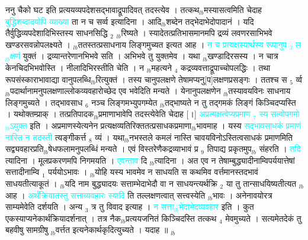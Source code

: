 \documentclass[article,12pt,a4paper]{memoir}%
\newcommand{\quotelemma}[1]{\textcolor{cyan}{#1}}
\newcounter{parCount}
\begin{document}
	  
	  \pstart \leavevmode%
	ननु चैको घट इति प्रत्ययव्यपदेशसद्भावाद्रूपादिवत् तदस्त्येव । तत्कथ{\tiny $_{lb}$}मस्यासत्वमिति चेदाह \quotelemma{बुद्धिशब्दादयोपि व्याख्या} ता न च सर्व्व इत्यादिना । आदि{\tiny $_{lb}$}शब्देन तद्भेदाभेदोपादानं । यदि तैर्वुद्धिव्यपदेशादिभिस्तस्य साधनसिद्धि {\tiny $_{2}$} {\tiny $_{lb}$}रिष्यते । स्यादेतत्प्रतिभासमानमपि द्रव्यं लवणरसाभिभवे खण्डरसवन्नोपलक्ष्यते । {\tiny $_{lb}$}ततस्तत्प्रसाधनाय लिङ्गमुच्यत इत्यत आह । \quotelemma{न च प्रत्यक्षस्यार्थस्य रूपानुप {\tiny $_{3}$} ल{\tiny $_{lb}$}क्षणं} \cite[3b3]{vn-msN} युक्तं । द्रव्यान्तरेणानभिभवे सति । अभिभवे तु युक्तमेव । यथा {\tiny $_{lb}$}खण्डादिरसस्य । न चात्र केनचिदभिभवोस्ति । नीलादिभिरस्तीति चेति । न {\tiny $_{lb}$}महत्यने {\tiny $_{4}$} कद्रव्यवत्ताद्रूपाच्चोपलद्धिः । तथा रूपसंस्काराभावाद्या वानुपलब्धि{\tiny $_{lb}$}रित्युक्तं । तस्य चानुपलक्षणे तेषामप्यनु[प]लक्षणप्रसङ्गः । ततश्च स {\tiny $_{5}$} र्व्व{\tiny $_{lb}$}पदार्थानामनुपलक्षणाल्लोकव्यवहारोच्छेद एव भवेदिति मन्यते । येनानुपलक्षणेन {\tiny $_{lb}$}तस्यावयविनः साधनाय लिङ्गमुच्यते । तद्भावसाध {\tiny $_{6}$} नञ्च लिङ्गमभ्युपगम्येत {\tiny $_{lb}$}तद्भाष्यते न तु तद्गमकं लिङ्गं किञ्चिदप्यस्ति । यथोक्तम्प्राक् । तत्प्रतिपादक{\tiny $_{lb}$}प्रमाणाभावेपि तदस्त्येवेति चेदाह [।] \quotelemma{अप्रत्यक्षत्वेप्यप्रमाण {\tiny $_{7}$} स्य सत्वोपगमो{\tiny $_{lb}$}ऽयुक्त} \cite[3b3]{vn-msN} इति । अप्रमाणस्येत्यनेन प्रत्यक्षव्यतिरिक्ततत्प्रसाधकप्रमाणा{\tiny $_{lb}$}भावमाह । यस्य \quotelemma{सद्भावसाधकं प्रमाणं नास्ति न तदस्ती} त्यङ्गीकर्त्त {\tiny $_{8}$} व्यं । यथा{\tiny $_{lb}$}नभस्तले कमलं नास्ति चावयविनोऽस्तित्वसाधकं प्रमाणमिति सद्व्यवहारप्रति{\tiny $_{lb}$}षेधफलामनुपलब्धिं मन्यते । एवं विस्तरेणैकद्रव्याभावं प्र {\tiny $_{9}$} \leavevmode{} तिपाद्य प्रकृतमुप{\tiny $_{lb}$} \leavevmode{} संहरति । \quotelemma{तदि} त्यादिना । मूलप्रकरणमपि निगमयति । \quotelemma{एवन्ताव} दि \cite[3b3]{vn-msN} {\tiny $_{lb}$}त्यादिना । अत एव न तेषाम्बुद्ध्यादीनाम्विपर्ययात्तेषां सत्तादीनाम्वि {\tiny $_{1}$} पर्ययोऽभावः । {\tiny $_{lb}$}योहि यस्य भावमेव न साधयति स कथमिव वर्त्तमानस्तदभावं साधयतीत्याकूतं । {\tiny $_{lb}$}यदि नाम बुद्ध्यादयः सत्ताम्भेदाभेदौ वा न साधयन्त्यर्थक्रि {\tiny $_{2}$} या तु तान्साधयिष्यतीत्यत {\tiny $_{lb}$}आह । \quotelemma{अर्थंक्रियातस्तु सत्ताव्यवहारः स्यादि} \cite[3b4]{vn-msN} ति तल्लक्षणत्वात् सत्त्वस्येति {\tiny $_{lb}$}भावः । अनेनावयोरत्र साम्यमेवेति दर्शयति । अन्य {\tiny $_{3}$} त्र तु विवाद इत्याह । \quotelemma{न सत्ता{\tiny $_{lb}$}भेदाभेदव्यवहार} \cite[3b4]{vn-msN} इति । कुत एकस्याप्यनेकार्थक्रियादर्शनात् । तत्र नैक{\tiny $_{lb}$}प्रत्ययजनितं किञ्चिदस्ति तत्कथ {\tiny $_{4}$} मेवमुच्यते । सत्यमेतदेकं तु बहवीषु सामग्रीषु {\tiny $_{lb}$}वर्त्तत इत्यनेकार्थकृदित्युच्यते । यदाह ॥
	{}
	\pend%
      {\tiny $_{lb}$}
	  \bigskip
	  \begingroup
	
\end{document}
